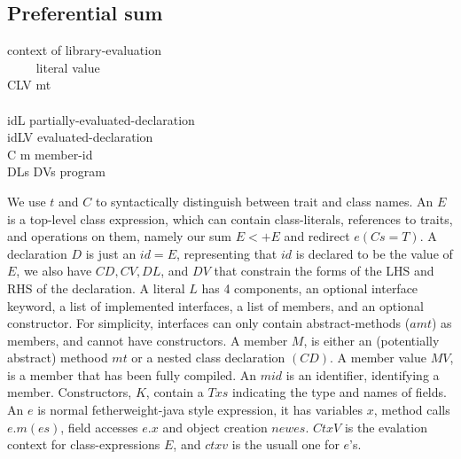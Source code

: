 \subsection{Preferential sum}

\begin{bnf}
  {context of library-evaluation}\\     {\ \ \mmid{}\ \ }       {literal value}\\     {C\eq{}LV \mmid{} mt}                                                    {}\\           {}\\     {id\eq{}L}                                                         {partially-evaluated-declaration}\\     {id\eq{}LV}                                                       {evaluated-declaration}\\    {C \mmid{} m}                                                      {member-id}\\      {DLs\Q{;} DVs}                                                     {program}
\end{bnf}

We use $t$ and $C$ to syntactically distinguish between trait and class names.
An $E$ is a top-level class expression, which can contain class-literals, references to traits, and operations on them, namely our sum $E <+ E$ and redirect $e(Cs=T)$.
A declaration $D$ is just an $id = E$, representing that $id$ is declared to be the value of $E$, we also have $CD, CV, DL$, and $DV$ that constrain the forms of the LHS and RHS of the declaration.
A literal $L$ has 4 components, an optional interface keyword, a list of implemented interfaces, a list of members, and an optional constructor. For simplicity, interfaces can only contain abstract-methods ($amt$) as members, and cannot have  constructors. A member $M$, is either an (potentially abstract) methood $mt$ or a nested class declaration $(CD)$. A member value $MV$, is a member that has been fully compiled. An $mid$ is an identifier, identifying a member.
Constructors, $K$, contain a $Txs$ indicating the type and names of fields. An $e$ is normal fetherweight-java style expression, it has variables $x$, method calls $e.m(es)$, field accesses $e.x$ and object creation $new es$.
$CtxV$ is the evalation context for class-expressions $E$, and $ctxv$ is the usuall one for $e$’s.

